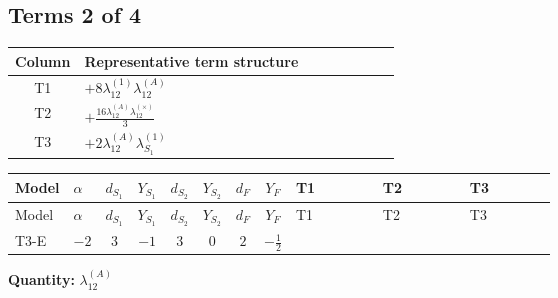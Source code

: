 \documentclass[8pt]{article}
\begin{document}
\begin{landscape}
\subsection*{Terms 2 of 4}
\begin{center}
\begin{tabular}{@{}c >{\raggedright\arraybackslash}p{0.82\linewidth}@{}}
\toprule
Column & Representative term structure \\
\midrule
T1 & \(\displaystyle +8 {\lambda_{12}^{(1)}} {\lambda_{12}^{(A)}}\) \\
\midrule
T2 & \(\displaystyle +\frac{16 {\lambda_{12}^{(A)}} {\lambda_{12}^{(\times)}}}{3}\) \\
\midrule
T3 & \(\displaystyle +2 {\lambda_{12}^{(A)}} {\lambda_{S_1}^{(1)}}\) \\
\midrule
\bottomrule
\end{tabular}
\end{center}
\smallskip
\tiny
\begin{longtable}{@{}llcccccc >{\raggedright\arraybackslash}p{0.21\linewidth} >{\raggedright\arraybackslash}p{0.21\linewidth} >{\raggedright\arraybackslash}p{0.21\linewidth}@{}}
\toprule
Model & $\alpha$ & $d_{S_1}$ & $Y_{S_1}$ & $d_{S_2}$ & $Y_{S_2}$ & $d_F$ & $Y_F$ & T1 & T2 & T3 \\
\midrule
\endfirsthead
\toprule
Model & $\alpha$ & $d_{S_1}$ & $Y_{S_1}$ & $d_{S_2}$ & $Y_{S_2}$ & $d_F$ & $Y_F$ & T1 & T2 & T3 \\
\midrule
\endhead
T3-E & $-2$ & $3$ & $-1$ & $3$ & $0$ & $2$ & $-\frac{1}{2}$ & \scriptsize\adjustbox{max width=\linewidth}{$\begin{gathered} +8 {\lambda_{12}^{(1)}} {\lambda_{12}^{(A)}}\end{gathered}$} & \scriptsize\adjustbox{max width=\linewidth}{$\begin{gathered} +\frac{16 {\lambda_{12}^{(A)}} {\lambda_{12}^{(\times)}}}{3}\end{gathered}$} & \scriptsize\adjustbox{max width=\linewidth}{$\begin{gathered} +2 {\lambda_{12}^{(A)}} {\lambda_{S_1}^{(1)}}\end{gathered}$} \\
\midrule
\bottomrule
\end{longtable}
\clearpage
\noindent\textbf{Quantity: }$\lambda_{12}^{(A)}$\par\smallskip

\end{landscape}
\end{document}
